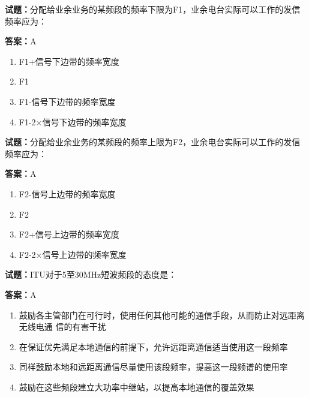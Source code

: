 \documentclass{ctexbook}
\begin{document}




\vspace{1em}

\textbf{试题：}分配给业余业务的某频段的频率下限为F1，业余电台实际可以工作的发信频率应为： 

\textbf{答案：}A 

\begin{enumerate}[leftmargin=3em]
  \item F1+信号下边带的频率宽度 

  \item F1 

  \item F1-信号下边带的频率宽度 

  \item F1-2×信号下边带的频率宽度 

\end{enumerate}






\vspace{1em}

\textbf{试题：}分配给业余业务的某频段的频率上限为F2，业余电台实际可以工作的发信频率应为： 

\textbf{答案：}A 

\begin{enumerate}[leftmargin=3em]
  \item F2-信号上边带的频率宽度 

  \item F2 

  \item F2+信号上边带的频率宽度 

  \item F2-2×信号上边带的频率宽度 

\end{enumerate}





\vspace{1em}

\textbf{试题：}ITU对于5至30MHz短波频段的态度是： 

\textbf{答案：}A 

\begin{enumerate}[leftmargin=3em]
  \item 鼓励各主管部门在可行时，使用任何其他可能的通信手段，从而防止对远距离无线电通
信的有害干扰 

  \item 在保证优先满足本地通信的前提下，允许远距离通信适当使用这一段频率 

  \item 同样鼓励本地和远距离通信尽量使用该段频率，提高这一段频谱的使用率 

  \item 鼓励在这些频段建立大功率中继站，以提高本地通信的覆盖效果 

\end{enumerate}
\end{document}
